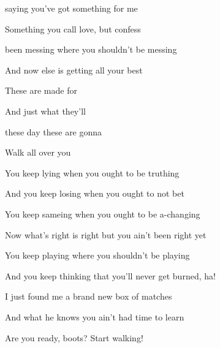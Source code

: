 

\zs
{} saying you've got something for me

Something you call love, but confess

 been messing where you shouldn't be messing

And now  else is getting all your best
\ks

\zr
These  are made for 

And  just what they'll 

 these day these  are gonna

Walk all over you
\kr

\zs
You keep lying when you ought to be truthing

And you keep losing when you ought to not bet

You keep sameing when you ought to be a-changing

Now what's right is right but you ain't been right yet
\ks

\zr\kr

\zs
You keep playing where you shouldn't be playing

And you keep thinking that you'll never get burned, ha!

I just found me a brand new box of matches

And what he knows you ain't had time to learn
\ks

\zr\kr

Are you ready, boots? Start walking!

\kp
